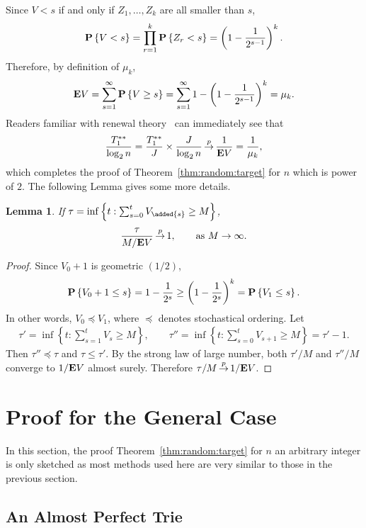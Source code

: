 \documentclass{article}
\newcommand{\Tss}{{T_1^{**}}}
\newcommand{\e}{{\textbf E}}
\newcommand{\p}[1]{{\textbf P}\left\{#1\right\}}
\newcommand\inprobHIGH{\,{\buildrel p \over \rightarrow}\,}
\newcommand\inprob{{\inprobHIGH}}
\newtheorem{lemma}{Lemma}
\begin{document}
Since $V < s$ if and only if $Z_{1},\ldots,Z_{k}$ are all smaller than $s$, 
$$
\p{V < s} = \prod_{r=1}^{k} \p{Z_r < s} = \left(1-\frac{1}{2^{s-1}} \right)^{k}.
$$
Therefore, by definition of $\mu_k$,
$$
\e V = \sum_{s=1}^{\infty} \p{V \ge s} = \sum_{s=1}^{\infty} 1 -
\left(1-\frac{1}{2^{s-1}} \right)^{k} = \mu_k.
$$
Readers familiar with renewal theory~\citep[chap.\ 4.4]{Durrett2010probability}
can immediately see that
$$
\frac{\Tss}{\log_2 n} 
= \frac{\Tss}{J} \times \frac {J}{\log_2 n} \inprob \frac{1}{\e V} =
\frac{1}{\mu_k},
$$
which completes the proof of Theorem~\ref{thm:random:target} for $n$ which is
power of $2$. The following Lemma gives some more details.
\begin{lemma}
    If $\tau = \inf\left\{t:\sum_{s=0}^t V_{\added{s}}  \ge M\right\}$,
    $$
    \frac{\tau}{M/\e V} \inprob 1, \qquad \text{as
    } M \to \infty.
    $$
    \label{lem:convergence}
\end{lemma}
\begin{proof}
    Since $V_0+1$ is geometric $(1/2)$,
    $$
    \p{V_0 + 1 \le s} 
    = 1-\frac{1}{2^{s}} \ge \left( 1- \frac{1}{2^{s}} \right)^k = \p{V_1 \le s}.
    $$
    In other words, $V_0 \preceq V_1$, where $\preceq$ denotes
    stochastical ordering.  
    Let 
    \begin{align*}
        \tau' = \inf\left\{t:\sum_{s=1}^t V_s  \ge M\right\}, \qquad
        \tau'' = \inf\left\{t:\sum_{s=0}^t V_{s+1}  \ge M\right\} = \tau'-1.
    \end{align*}
    Then $\tau'' \preceq \tau$ and $\tau \le \tau'.$ By the strong law of large
    number, both $\tau'/M$ and $\tau''/M$ converge to $1/\e V$ almost surely.
    Therefore $\tau/M \inprob 1/\e V$.
\end{proof}

\section{Proof for the General Case}

\label{sec:general}

In this section, the proof Theorem~\ref{thm:random:target} for $n$ an
arbitrary integer is only sketched as most methods used here are very similar
to those in the previous section.

\subsection{An Almost Perfect Trie}
\end{document}
